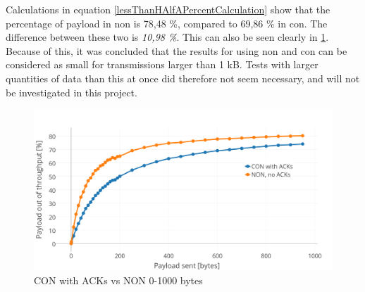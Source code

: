 \noindent Calculations in equation \ref{lessThanHAlfAPercentCalculation} show that the percentage of \gls{payload} in \gls{non} is 78,48 \%, compared to 69,86 \% in \gls{con}. The difference between these two is \textit{10,98 \%}. This can also be seen clearly in \ref{fig:NON0-kb2}. Because of this, it was concluded that the results for using \gls{non} and \gls{con} can be considered as small for transmissions larger than 1 kB. Tests with larger quantities of data than this at once did therefore not seem necessary, and will not be investigated in this project. 



\begin{figure}[ht]
    \centering
    \includegraphics[width=1.0\textwidth]{CONNON0-kwithACK.png}    
    \caption{CON with ACKs vs NON 0-1000 bytes}
    \label{fig:NON0-kb2}
\end{figure}


